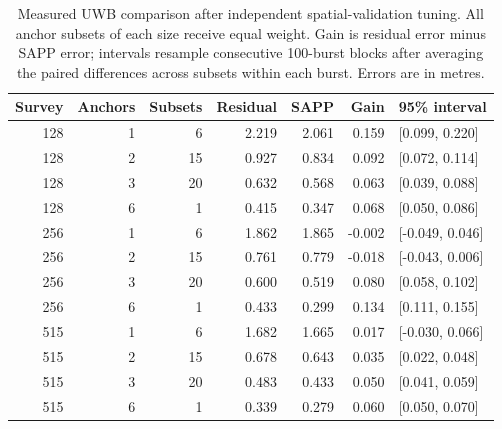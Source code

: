 \begin{table}[ht]
\centering\small
\caption{Measured UWB comparison after independent spatial-validation tuning. All anchor subsets of each size receive equal weight. Gain is residual error minus SAPP error; intervals resample consecutive 100-burst blocks after averaging the paired differences across subsets within each burst. Errors are in metres.}
\label{tab:uwboperating}
\begin{tabular}{rrr rrr l}
\toprule
Survey & Anchors & Subsets & Residual & SAPP & Gain & 95\% interval\\\midrule
128 & 1 & 6 & 2.219 & 2.061 & 0.159 & [0.099, 0.220] \\
128 & 2 & 15 & 0.927 & 0.834 & 0.092 & [0.072, 0.114] \\
128 & 3 & 20 & 0.632 & 0.568 & 0.063 & [0.039, 0.088] \\
128 & 6 & 1 & 0.415 & 0.347 & 0.068 & [0.050, 0.086] \\
256 & 1 & 6 & 1.862 & 1.865 & -0.002 & [-0.049, 0.046] \\
256 & 2 & 15 & 0.761 & 0.779 & -0.018 & [-0.043, 0.006] \\
256 & 3 & 20 & 0.600 & 0.519 & 0.080 & [0.058, 0.102] \\
256 & 6 & 1 & 0.433 & 0.299 & 0.134 & [0.111, 0.155] \\
515 & 1 & 6 & 1.682 & 1.665 & 0.017 & [-0.030, 0.066] \\
515 & 2 & 15 & 0.678 & 0.643 & 0.035 & [0.022, 0.048] \\
515 & 3 & 20 & 0.483 & 0.433 & 0.050 & [0.041, 0.059] \\
515 & 6 & 1 & 0.339 & 0.279 & 0.060 & [0.050, 0.070] \\
\bottomrule
\end{tabular}
\end{table}
